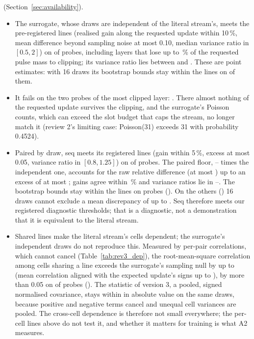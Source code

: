 (Section~\ref{sec:availability}).
\begin{itemize}
\item The surrogate, whose draws are independent of the literal stream's, meets the pre-registered lines (realised gain along
      the requested update within 10\,\%, mean difference beyond sampling noise at most 0.10, median variance ratio in
      $[0.5, 2]$) on \RYProbeSurMeetsN{} of \RYProbeN{} probes, including layers that lose up to \RYProbeOkLostMax\,\% of the
      requested pulse mass to clipping; its variance ratio lies between \RYProbeSurVarMin{} and \RYProbeSurVarMax. These are
      point estimates: with 16 draws its bootstrap bounds stay within the lines on \RYProbeSurAtNinetyFiveN{} of them.
\item It fails on the two probes of the most clipped layer: \RYProbeSurFailList. There almost nothing of the requested update
      survives the clipping, and the surrogate's Poisson counts, which can exceed the slot budget that caps the stream, no longer
      match it (review 2's limiting case: Poisson(31) exceeds 31 with probability 0.4524).
\item Paired by draw, seq meets its registered lines (gain within 5\,\%, excess at most 0.05, variance ratio in
      $[0.8, 1.25]$) on \RYProbeSeqMeetsN{} of \RYProbeN{} probes. The paired floor, \RYProbeFloorRatioMin--\RYProbeFloorRatioMax{}
      times the independent one, accounts for the raw relative difference (at most \RYProbeSeqRawMax) up to an excess of at
      most \RYProbeSeqExcessMax; gains agree within \RYProbeSeqGainDevMax\,\% and variance ratios lie in
      \RYProbeSeqVarMin--\RYProbeSeqVarMax. The bootstrap bounds stay within the lines on \RYProbeSeqAtNinetyFiveN{} probes
      (\RYProbeSeqAtNinetyFiveList). On the others (\RYProbeSeqNotNinetyFiveList) 16 draws cannot exclude a mean discrepancy of
      up to \RYProbeSeqExcessPNinetyFiveMax. Seq therefore meets our registered diagnostic thresholds; that is a diagnostic,
      not a demonstration that it is equivalent to the literal stream.
\item Shared lines make the literal stream's cells dependent; the surrogate's independent draws do not reproduce this.
      Measured by per-pair correlations, which cannot cancel (Table~\ref{tab:rev3_dep}), the root-mean-square correlation among
      cells sharing a line exceeds the surrogate's sampling null by up to \RYDepExcessMax{} (mean correlation aligned with the
      expected update's signs up to \RYDepAlignedMax), by more than 0.05 on \RYDepLargeN{} of \RYProbeN{} probes
      (\RYDepLargeList). The statistic of version 3, a pooled, signed normalised covariance, stays within \RYDepVthreePooledMax{}
      in absolute value on the same draws, because positive and negative terms cancel and unequal cell variances are pooled.
      The cross-cell dependence is therefore not small everywhere; the per-cell lines above do not test it, and whether it
      matters for training is what A2 measures.
\end{itemize}
